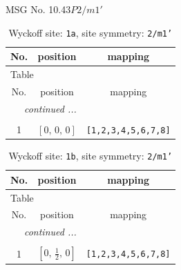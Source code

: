 \documentclass[fleqn,8pt]{jsarticle}
\begin{document}
\setcounter{MaxMatrixCols}{32}

\renewcommand{\tablename}{Table~}
\renewcommand{\figurename}{Figure~}
\begin{center}
\LARGE
MSG No. 10.43\quad$P2/m1'$
\end{center}
\renewcommand{\arraystretch}{1.2}
\begin{longtable}{ccc}
\caption{Wyckoff site: {\tt 1a}, site symmetry: {\tt 2/m1'}}
 \\
 \hline \hline
No. & position & mapping \\ \hline \endfirsthead

\multicolumn{2}{l}{\tablename\ \thetable{}} \\
 \hline \hline
No. & position & mapping \\ \hline \endhead

 \hline \hline
\multicolumn{2}{r}{\footnotesize\it continued ...} \\ \endfoot

 \hline \hline
\multicolumn{2}{r}{} \\ \endlastfoot

1 & $\left[ 0,\, 0,\, 0 \right]$ & {\tt [1,2,3,4,5,6,7,8]} \\
\end{longtable}
\renewcommand{\arraystretch}{1.2}
\begin{longtable}{ccc}
\caption{Wyckoff site: {\tt 1b}, site symmetry: {\tt 2/m1'}}
 \\
 \hline \hline
No. & position & mapping \\ \hline \endfirsthead

\multicolumn{2}{l}{\tablename\ \thetable{}} \\
 \hline \hline
No. & position & mapping \\ \hline \endhead

 \hline \hline
\multicolumn{2}{r}{\footnotesize\it continued ...} \\ \endfoot

 \hline \hline
\multicolumn{2}{r}{} \\ \endlastfoot

1 & $\left[ 0,\, \frac{1}{2},\, 0 \right]$ & {\tt [1,2,3,4,5,6,7,8]} \\
\end{longtable}
\renewcommand{\arraystretch}{1.2}
\end{document}

